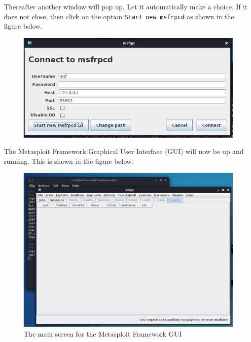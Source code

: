 \documentclass[a4paper, 12pt, titlepage]{report}
\begin{document}
Thereafter another window will pop up. Let it automatically make a choice. If it does not close, then click on the option \texttt{Start new msfrpcd} as shown in the figure below.
\begin{figure}[H]
    \centering
    \includegraphics[scale=0.4]{pics/prompt2.PNG}
\end{figure}
The Metasploit Framework Graphical User Interface (GUI) will now be up and running. This is shown in the figure below.
\begin{figure}[H]
    \centering
    \includegraphics[scale=0.4]{pics/metaguimain.PNG}
    \caption{The main screen for the Metasploit Framework GUI}
\end{figure}
\end{document}
